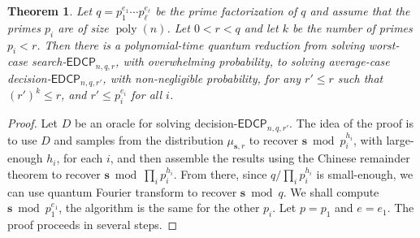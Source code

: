 \documentclass[11pt]{article}
\theoremstyle{plain}
\newtheorem{theorem}{Theorem}
\theoremstyle{definition}
\DeclareMathOperator{\poly}{poly}
\def\edcp{\mathsf{EDCP}}
\begin{document}
\begin{theorem}
    Let $q = p_1^{e_1} \cdots p_\ell^{e_\ell}$ be the prime factorization of $q$ and assume that the primes $p_i$ are of size $\poly(n)$. Let $0 < r < q$ and let $k$ be the number of primes $p_i < r$. Then there is a polynomial-time quantum reduction from solving worst-case search-$\edcp_{n, q, r}$, with overwhelming probability, to solving average-case decision-$\edcp_{n, q, r'}$, with non-negligible probability, for any $r' \le r$ such that $(r')^k \le r$, and $r' \le p_i^{e_i}$ for all $i$. 
\end{theorem}
\begin{proof}
    Let $D$ be an oracle for solving decision-$\edcp_{n, q, r'}$. The idea of the proof is to use $D$ and samples from the distribution $\mu_{\bm{s}, r}$ to recover $\bm{s} \bmod p_i^{h_i}$, with large-enough $h_i$, for each $i$, and then assemble the results using the Chinese remainder theorem to recover $\bm{s} \bmod \prod_i p_i^{h_i}$. From there, since $q / \prod_i p_i^{h_i}$ is small-enough, we can use quantum Fourier transform to recover $\bm{s} \bmod q$. We shall compute $\bm{s} \bmod p_1^{e_1}$, the algorithm is the same for the other $p_i$. Let $p = p_1$ and $e = e_1$. The proof proceeds in several steps.


\end{proof}
\end{document}
